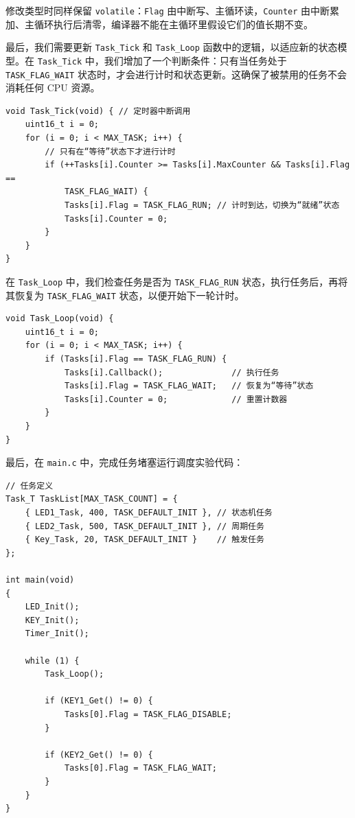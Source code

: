修改类型时同样保留 \texttt{volatile}：\texttt{Flag} 由中断写、主循环读，\texttt{Counter} 由中断累加、主循环执行后清零，编译器不能在主循环里假设它们的值长期不变。

最后，我们需要更新 \texttt{Task\_Tick} 和 \texttt{Task\_Loop} 函数中的逻辑，以适应新的状态模型。在 \texttt{Task\_Tick} 中，我们增加了一个判断条件：只有当任务处于 \texttt{TASK\_FLAG\_WAIT} 状态时，才会进行计时和状态更新。这确保了被禁用的任务不会消耗任何 CPU 资源。

\begin{lstlisting}[style=c]
void Task_Tick(void) { // 定时器中断调用
    uint16_t i = 0;
    for (i = 0; i < MAX_TASK; i++) {
        // 只有在“等待”状态下才进行计时
        if (++Tasks[i].Counter >= Tasks[i].MaxCounter && Tasks[i].Flag ==
            TASK_FLAG_WAIT) {
            Tasks[i].Flag = TASK_FLAG_RUN; // 计时到达，切换为“就绪”状态
            Tasks[i].Counter = 0;
        }
    }
}
\end{lstlisting}

在 \texttt{Task\_Loop} 中，我们检查任务是否为 \texttt{TASK\_FLAG\_RUN} 状态，执行任务后，再将其恢复为 \texttt{TASK\_FLAG\_WAIT} 状态，以便开始下一轮计时。

\begin{lstlisting}[style=c]
void Task_Loop(void) {
    uint16_t i = 0;
    for (i = 0; i < MAX_TASK; i++) {
        if (Tasks[i].Flag == TASK_FLAG_RUN) {
            Tasks[i].Callback();              // 执行任务
            Tasks[i].Flag = TASK_FLAG_WAIT;   // 恢复为“等待”状态
            Tasks[i].Counter = 0;             // 重置计数器
        }
    }
}
\end{lstlisting}

最后，在 \texttt{main.c} 中，完成任务堵塞运行调度实验代码：

\begin{lstlisting}[style=c]
// 任务定义
Task_T TaskList[MAX_TASK_COUNT] = {
    { LED1_Task, 400, TASK_DEFAULT_INIT }, // 状态机任务
    { LED2_Task, 500, TASK_DEFAULT_INIT }, // 周期任务
    { Key_Task, 20, TASK_DEFAULT_INIT }    // 触发任务
};

int main(void)
{
    LED_Init();
    KEY_Init();
    Timer_Init();

    while (1) {
        Task_Loop();

        if (KEY1_Get() != 0) {
            Tasks[0].Flag = TASK_FLAG_DISABLE;
        }

        if (KEY2_Get() != 0) {
            Tasks[0].Flag = TASK_FLAG_WAIT;
        }
    }
}
\end{lstlisting}

